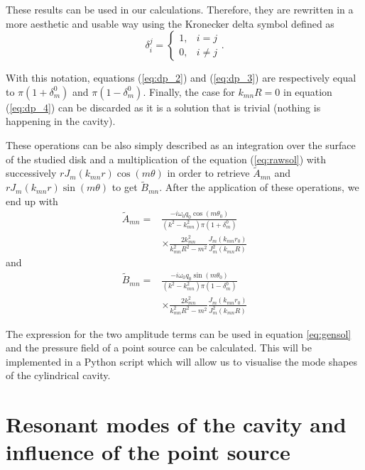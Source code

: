 \documentclass[%
 reprint,
 amsmath,amssymb,
 aps,
]{revtex4-2}
\begin{document}
These results can be used in our calculations. Therefore, they are rewritten in a more aesthetic and usable way using the Kronecker delta symbol defined as 
\begin{equation}
   \delta_i^j = \begin{cases}
       1, & i = j\\ 0, & i \ne j
   \end{cases}.
\end{equation}

With this notation, equations (\ref{eq:dp_2}) and (\ref{eq:dp_3}) are respectively equal to $\pi(1 + \delta_m^0)$ and $\pi(1 - \delta_m^0)$. Finally, the case for $k_{mn}R = 0$ in equation (\ref{eq:dp_4}) can be discarded as it is a solution that is trivial (nothing is happening in the cavity).

These operations can be also simply described as an integration over the surface of the studied disk and a multiplication of the equation (\ref{eq:rawsol}) with successively $r J_m(k_{mn}r) \cos(m\theta)$ in order to retrieve $\tilde{A}_{mn}$ and $r J_m(k_{mn}r) \sin(m\theta)$ to get $\tilde{B}_{mn}$. After the application of these operations, we end up with
\begin{equation}
    \begin{split}
        \tilde{A}_{mn} = &
        \frac{- i \omega_0 q_0 \cos(m \theta_0)}{(k^2 - k^2_{mn}) \pi (1 + \delta_m^0)}
        \\ & \times \frac{2 k_{mn}^2}{k^2_{mn} R^2 - m^2} 
        \frac{J_m(k_{mn}r_0)}{J^2_m(k_{mn}R)}
    \end{split}
\end{equation}
and 
\begin{equation}
    \begin{split}
        \tilde{B}_{mn} = &
        \frac{- i \omega_0 q_0 \sin(m \theta_0)}{(k^2 - k^2_{mn}) \pi (1 - \delta_m^0)} 
        \\ & \times \frac{2 k_{mn}^2}{k^2_{mn} R^2 - m^2}
        \frac{J_m(k_{mn}r_0)}{J^2_m(k_{mn}R)}
    \end{split}
\end{equation}

The expression for the two amplitude terms can be used in equation \ref{eq:gensol} and the pressure field of a point source can be calculated. This will be implemented in a Python script which will allow us to visualise the mode shapes of the cylindrical cavity. %

\section{Resonant modes of the cavity and influence of the point source}
\end{document}
